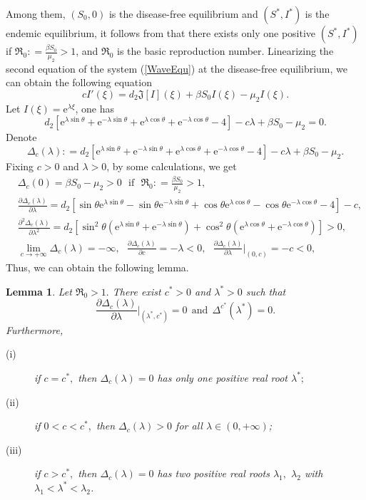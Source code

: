 \documentclass[final,3p,times]{elsarticle}
\newtheorem{lemma}{Lemma}[section]
\numberwithin{equation}{section}
\begin{document}
Among them, $(S_{0},0)$ is the disease-free equilibrium and $(S^{\ast},I^{\ast})$ is the endemic equilibrium, it follows from \cite{KorobeinikovBMB2006} that there exists only one positive $(S^{\ast},I^{\ast})$ if $\Re_0: = \frac{\beta S_0}{\mu_2} > 1$, and $\Re_0$ is the
basic reproduction number. Linearizing the second equation of the system (\ref{WaveEqu}) at the disease-free equilibrium, we can obtain the following equation
\begin{equation}\label{LinEqu}
c I'(\xi) =
d_2\mathfrak{J}[I](\xi) + \beta S_0I(\xi) - \mu_2 I(\xi).
\end{equation}
Let $I(\xi) = \mathrm{e}^{\lambda \xi}$, one has
\[
d_2 \left[\mathrm{e}^{\lambda \sin\theta} + \mathrm{e}^{-\lambda \sin\theta} + \mathrm{e}^{\lambda \cos\theta} + \mathrm{e}^{-\lambda \cos\theta}-4\right] - c\lambda + \beta S_0 - \mu_2 = 0.
\]
Denote
\begin{equation}\label{CharEqu}
\Delta_c(\lambda) : =
d_2 \left[\mathrm{e}^{\lambda \sin\theta} + \mathrm{e}^{-\lambda \sin\theta} + \mathrm{e}^{\lambda \cos\theta} + \mathrm{e}^{-\lambda \cos\theta}-4\right] - c\lambda + \beta S_0 - \mu_2.
\end{equation}
Fixing $c>0$ and $\lambda>0$, by some calculations, we get
\begin{align*}
&\Delta_c(0) = \beta S_0 - \mu_2 > 0\ \ \ \textrm{if}\ \ \ \Re_0: = \frac{\beta S_0}{\mu_2} > 1,\\
&\frac{\partial \Delta_c(\lambda)}{\partial\lambda} = d_2 \left[\sin\theta\mathrm{e}^{\lambda \sin\theta} - \sin\theta \mathrm{e}^{-\lambda \sin\theta} + \cos\theta\mathrm{e}^{\lambda \cos\theta} - \cos\theta \mathrm{e}^{-\lambda \cos\theta}-4\right] - c,\\
&\frac{\partial^2 \Delta_c(\lambda)}{\partial\lambda^2} = d_2 \left[\sin^2\theta\left(\mathrm{e}^{\lambda \sin\theta} + \mathrm{e}^{-\lambda \sin\theta}\right) + \cos^2\theta\left(\mathrm{e}^{\lambda \cos\theta} + \mathrm{e}^{-\lambda \cos\theta}\right)\right] > 0,\\
&\lim_{c\rightarrow+\infty} \Delta_c (\lambda) = -\infty,\ \ \ \frac{\partial \Delta_c(\lambda)}{\partial c}= -\lambda < 0,\ \ \ \frac{\partial \Delta_c(\lambda)}{\partial\lambda}\bigg|_{(0,c)} = -c < 0,
\end{align*}
Thus, we can obtain the following lemma.
\begin{lemma}\label{WaveSpeed}
Let $\Re_{0}>1.$ There exist $c^*>0$ and $\lambda^*>0$ such that
\[
\frac{\partial \Delta_c(\lambda)}{\partial \lambda}\bigg|_{(\lambda^*,c^*)} = 0\ \ \textrm{and}\ \ \Delta^{c^*}(\lambda^*) = 0.
\]
Furthermore,
\begin{description}
  \item[(i)] if $c=c^*,$ then $\Delta_c(\lambda)=0$ has only one positive real root $\lambda^*;$
  \item[(ii)] if $0<c<c^*,$ then $\Delta_c(\lambda)>0$ for all $\lambda\in(0, +\infty)$;
  \item[(iii)] if $c>c^*,$ then $\Delta_c(\lambda)=0$ has two positive real roots $\lambda_1,$ $\lambda_2$ with $\lambda_1<\lambda^*<\lambda_2$.
\end{description}
\end{lemma}
\end{document}

